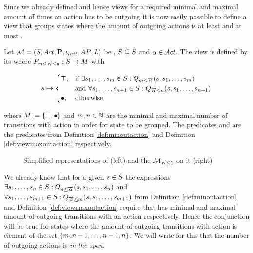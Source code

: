 \documentclass[preview]{standalone}
\begin{document}
Since we already defined \grpfctsN and hence views for a required minimal and maximal amount of times an action has to be outgoing it is now easily possible to define a view that groups states where the amount of outgoing actions is at least \numoutact and at most \numoutactb. 

\begin{definition}
	Let $\chgph = \chgphtuple$ be \achgphN, $\smstates \subseteq \states$ and $\action \in \actions$. The view 
	\viewspanoutaction is defined by its \grpfctN where $\gfctsubspanoutaction : \states \to \arbset$ with
	
	\[
	\state \mapsto
	\begin{cases}
			\group,				& \text{if } \exists \state_1, \dots, \state_\numoutactb \in \states: \predminoutact[\numoutactb] \\ &\text{and } \forall \state_1, \dots, \state_{\numoutact+1} \in \states: \predmaxoutact \\
			\remelem,          	& \text{otherwise}
		\end{cases}
	\]
	
	where $\imggrp := \imggrpbinview$
	and $\numoutactb, \numoutact \in \natnums$ are the minimal and maximal number of transitions with action \action in order for state to be grouped. The predicates \predminoutact and \predmaxoutact are the predicates from Definition \ref{def:minoutaction} and Definition \ref{def:viewmaxoutaction} respectively.
\end{definition}

\begin{figure}[h]
	\begin{minipage}{.5\textwidth}
		\hspace{5mm}
		
	\end{minipage}%
	\begin{minipage}{.5\textwidth}
		\hspace{5mm}
		
	\end{minipage}
	\caption{Simplified representations of \mdp (left) and the \viewN $\view[\pptymaxoutact{1}{\outact}]$ on it (right)}
	\label{fig:outActMaxAfter} 
\end{figure}

We already know that for a given $\state \in \states$ the expressions $\exists \state_1, \dots, \state_\numoutact \in \states: \predminoutact$ and $\forall \state_1, \dots, \state_{\numoutactb+1} \in \states: \predmaxoutact[\numoutactb]$ from Definition \ref{def:minoutaction} and Definition \ref{def:viewmaxoutaction} require that \state has minimal and maximal amount of outgoing transitions with an action \action respectively. Hence the conjunction will be true for states where the amount of outgoing transitions with action \action is element of the set $\{\numoutactb, \numoutact+1, \dots, \numoutact-1, \numoutact\}$. We will write for this that the number of outgoing actions is \emph{in the span}.
\end{document}
